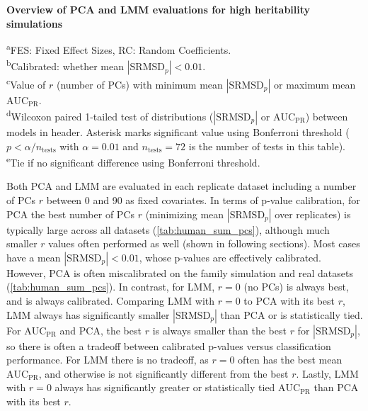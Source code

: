 \documentclass[11pt]{article}
\newcommand{\rmsd}{\text{SRMSD}_p}
\newcommand{\auc}{\text{AUC}_\text{PR}}
\begin{document}
\begin{linenumbers}
\begin{table}[b!]
  \centering
  \scriptsize
  \caption{
    \textbf{Overview of PCA and LMM evaluations for high heritability simulations}
  }
  \label{tab:human_sum_pcs}
  \begin{flushleft}
    \textsuperscript{a}FES: Fixed Effect Sizes, RC: Random Coefficients.\\
    \textsuperscript{b}Calibrated: whether mean $|\rmsd| < 0.01$.\\
    \textsuperscript{c}Value of $r$ (number of PCs) with minimum mean $|\rmsd|$ or maximum mean $\auc$.\\
    \textsuperscript{d}Wilcoxon paired 1-tailed test of distributions ($|\rmsd|$ or $\auc$) between models in header.
    Asterisk marks significant value using Bonferroni threshold ($p < \alpha/n_\text{tests}$ with $\alpha = 0.01$ and $n_\text{tests} = 72$ is the number of tests in this table).\\
    \textsuperscript{e}Tie if no significant difference using Bonferroni threshold.
  \end{flushleft}
\end{table}

Both PCA and LMM are evaluated in each replicate dataset including a number of PCs $r$ between 0 and 90 as fixed covariates.
In terms of p-value calibration, for PCA the best number of PCs $r$ (minimizing mean $|\rmsd|$ over replicates) is typically large across all datasets (\cref{tab:human_sum_pcs}), although much smaller $r$ values often performed as well (shown in following sections).
Most cases have a mean $|\rmsd| < 0.01$, whose p-values are effectively calibrated.
However, PCA is often miscalibrated on the family simulation and real datasets (\cref{tab:human_sum_pcs}).
In contrast, for LMM, $r=0$ (no PCs) is always best, and is always calibrated.
Comparing LMM with $r=0$ to PCA with its best $r$, LMM always has significantly smaller $|\rmsd|$ than PCA or is statistically tied.
% 
For $\auc$ and PCA, the best $r$ is always smaller than the best $r$ for $|\rmsd|$, so there is often a tradeoff between calibrated p-values versus classification performance.
For LMM there is no tradeoff, as $r=0$ often has the best mean $\auc$, and otherwise is not significantly different from the best $r$.
Lastly, LMM with $r=0$ always has significantly greater or statistically tied $\auc$ than PCA with its best $r$.


\end{linenumbers}
\end{document}
